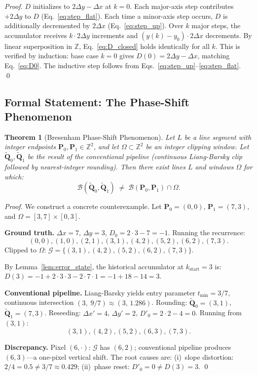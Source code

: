 \documentclass[12pt,a4paper]{article}
\newtheorem{theorem}{Theorem}[section]
\theoremstyle{definition}
\newcommand{\Z}{\mathbb{Z}}
\newcommand{\Zt}{\mathbb{Z}^2}
\newcommand{\Bresen}{\mathcal{B}}
\newcommand{\dx}{\Delta x}
\newcommand{\dy}{\Delta y}
\begin{document}
\begin{proof}
$D$ initializes to $2\dy - \dx$ at $k=0$. Each major-axis
step contributes $+2\dy$ to $D$
(Eq.~\eqref{eq:step_flat}). Each time a minor-axis step
occurs, $D$ is additionally decremented by $2\dx$
(Eq.~\eqref{eq:step_up}). Over $k$ major steps, the
accumulator receives $k \cdot 2\dy$ increments and
$(y(k) - y_0) \cdot 2\dx$ decrements. By linear
superposition in $\Z$, Eq.~\eqref{eq:D_closed} holds
identically for all $k$. This is verified by induction:
base case $k=0$ gives $D(0) = 2\dy - \dx$, matching
Eq.~\eqref{eq:D0}. The inductive step follows from
Eqs.~\eqref{eq:step_up}--\eqref{eq:step_flat}. \qed
\end{proof}

\subsection{Formal Statement: The Phase-Shift Phenomenon}

\begin{theorem}[Bresenham Phase-Shift Phenomenon]
\label{thm:phase_shift}
Let $L$ be a line segment with integer endpoints
$\mathbf{P}_0, \mathbf{P}_1 \in \Zt$, and let
$\Omega \subset \Zt$ be an integer clipping window.
Let $\tilde{\mathbf{Q}}_0, \tilde{\mathbf{Q}}_1$ be the
result of the conventional pipeline (continuous
Liang-Barsky clip followed by nearest-integer rounding).
Then there exist lines $L$ and windows $\Omega$ for which:
\[
  \Bresen(\tilde{\mathbf{Q}}_0, \tilde{\mathbf{Q}}_1)
  \;\neq\; \Bresen(\mathbf{P}_0, \mathbf{P}_1) \cap \Omega.
\]
\end{theorem}

\begin{proof}
We construct a concrete counterexample. Let
$\mathbf{P}_0 = (0,0)$, $\mathbf{P}_1 = (7,3)$, and
$\Omega = [3,7] \times [0,3]$.

\medskip
\noindent\textbf{Ground truth.} $\dx = 7$, $\dy = 3$,
$D_0 = 2\cdot3-7 = -1$. Running the recurrence:
\[
  (0,0),(1,0),(2,1),(3,1),(4,2),(5,2),(6,2),(7,3).
\]
Clipped to $\Omega$: $\mathcal{G} = \{(3,1),(4,2),(5,2),(6,2),(7,3)\}$.

By Lemma~\ref{lem:error_state}, the historical accumulator
at $k_{\mathrm{start}} = 3$ is:
$D(3) = -1 + 2\cdot3\cdot3 - 2\cdot7\cdot1 = -1+18-14 = 3$.

\medskip
\noindent\textbf{Conventional pipeline.} Liang-Barsky
yields entry parameter $t_{\min} = 3/7$, continuous
intersection $(3,\; 9/7) \approx (3,\,1.286)$.  Rounding:
$\tilde{\mathbf{Q}}_0 = (3,1)$, $\tilde{\mathbf{Q}}_1 =
(7,3)$. Reseeding: $\dx' = 4$, $\dy' = 2$,
$D'_0 = 2\cdot2-4 = 0$. Running from $(3,1)$:
\[
  (3,1),(4,2),(5,2),(6,3),(7,3).
\]

\noindent\textbf{Discrepancy.} Pixel $(6,\cdot)$:
$\mathcal{G}$ has $(6,2)$; conventional pipeline produces
$(6,3)$---a one-pixel vertical shift. The root causes are:
(i)~slope distortion: $2/4 = 0.5 \ne 3/7 \approx 0.429$;
(ii)~phase reset: $D'_0 = 0 \ne D(3) = 3$.
\qed
\end{proof}
\end{document}
